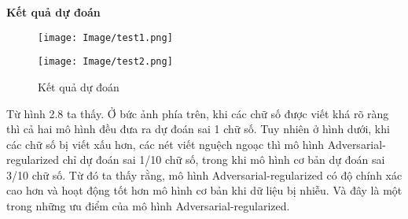 \textbf{Kết quả dự đoán}

\begin{figure}[h]
    \centering
    \texttt{[image: Image/test1.png]}

    \texttt{[image: Image/test2.png]}
    \caption{Kết quả dự đoán}
    \label{fig 2.8:Kết quả dự đoán}
\end{figure}

Từ hình 2.8 ta thấy. Ở bức ảnh phía trên, khi các chữ số được viết khá rõ ràng thì cả hai mô hình đều đưa ra dự đoán sai 1 chữ số.
Tuy nhiên ở hình dưới, khi các chữ số bị viết xấu hơn, các nét viết nguệch ngoạc thì mô hình Adversarial-regularized chỉ dự đoán sai 1/10 chữ số, trong khi mô hình cơ bản dự đoán sai 3/10 chữ số.
Từ đó ta thấy rằng, mô hình Adversarial-regularized có độ chính xác cao hơn và hoạt động tốt hơn mô hình cơ bản khi dữ liệu bị nhiễu. Và đây là một trong những ưu điểm của mô hình Adversarial-regularized.

